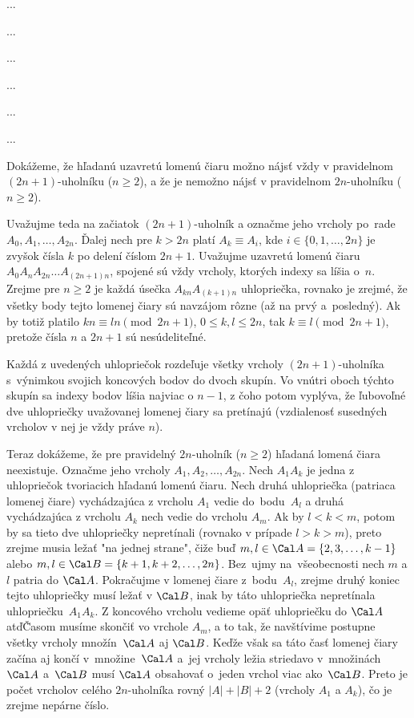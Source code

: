 ﻿{%
...}

{%
...}

{%
...}

{%
...}

{%
...}

{%
...}

{%
Dokážeme, že hľadanú uzavretú lomenú čiaru možno nájsť vždy v
pravidelnom $(2n+1)$-uholníku ($n\ge 2$), a že je nemožno nájsť
v pravidelnom $2n$-uholníku ($n\ge 2$).

Uvažujme teda na začiatok $(2n+1)$-uholník
a označme jeho vrcholy po~rade $A_0, A_1, \dots, A_{2n}$.
Ďalej nech pre $k>2n$ platí $A_k\equiv A_i$, kde
$i\in \{ 0, 1, \dots, 2n\}$ je zvyšok čísla $k$ po delení číslom $2n+1$.
Uvažujme uzavretú lomenú čiaru
$A_0A_nA_{2n}\dots A_{(2n+1)n}$, spojené sú vždy vrcholy, ktorých
indexy sa líšia o~$n$. Zrejme pre $n\ge 2$ je každá
úsečka $A_{kn}A_{(k+1)n}$ uhlopriečka, rovnako je zrejmé, že
všetky body tejto lomenej čiary sú navzájom rôzne (až na prvý a~posledný).
Ak by totiž platilo $kn \equiv ln \pmod {2n+1}$,
$0\le k, l \le 2n$, tak $k\equiv l \pmod {2n+1}$,
pretože čísla $n$ a $2n+1$ sú nesúdeliteľné.

Každá z uvedených uhlopriečok rozdeľuje všetky vrcholy
$(2n+1)$-uholníka s~vý\-nim\-kou svojich koncových bodov do dvoch skupín.
Vo vnútri oboch týchto skupín sa indexy bodov líšia najviac o $n-1$, z
čoho potom vyplýva, že ľubovoľné dve uhlopriečky uvažovanej lomenej čiary sa
pretínajú (vzdialenosť susedných vrcholov v nej je vždy práve $n$).

Teraz dokážeme, že pre pravidelný $2n$-uholník ($n\ge 2$)
hľadaná lomená čiara neexistuje. Označme jeho vrcholy $A_1, A_2,
\dots, A_{2n}$.
Nech $A_1A_k$ je jedna z uhlopriečok tvoriacich hľadanú lomenú čiaru.
Nech druhá uhlopriečka  (patriaca lomenej čiare)
vychádzajúca z vrcholu $A_1$ vedie do~bodu~$A_l$
a druhá vychádzajúca z vrcholu $A_k$ nech vedie do vrcholu $A_m$.
Ak by $l<k<m$, potom by sa tieto dve uhlopriečky nepretínali (rovnako v
prípade $l>k>m$), preto zrejme musia ležať "na jednej strane", čiže buď
$m, l \in {\Cal A}= \{2,3,\dots, k-1\}$ alebo
$m, l \in {\Cal B}= \{k+1, k+2, \dots, 2n\}$.
Bez~ujmy na~vše\-obec\-nos\-ti nech $m$ a $l$ patria do $\Cal A$. Pokračujme
v lomenej čiare z~bodu~$A_l$,
zrejme druhý koniec tejto uhlopriečky musí ležať
v $\Cal B$, inak by táto uhlopriečka nepretínala uhlo\-prieč\-ku~$A_1A_k$.
Z koncového vrcholu vedieme opäť uhlopriečku do $\Cal A$ atď\.
Časom musíme skončiť vo vrchole $A_m$, a to tak, že navštívime postupne
všetky vrcholy množín~$\Cal A$ aj $\Cal B$. Keďže však sa táto časť
lomenej čiary začína aj končí v~mno\-ži\-ne~$\Cal A$ a~jej vrcholy ležia
striedavo v~mno\-ži\-nách~$\Cal A$ a~$\Cal B$ musí $\Cal A$ obsahovať
o~jeden vrchol viac ako~$\Cal B$. Preto je počet vrcholov celého
$2n$-uholníka rovný $|A|+|B|+2$ (vrcholy $A_1$ a $A_k$), čo je zrejme nepárne
číslo.
}

